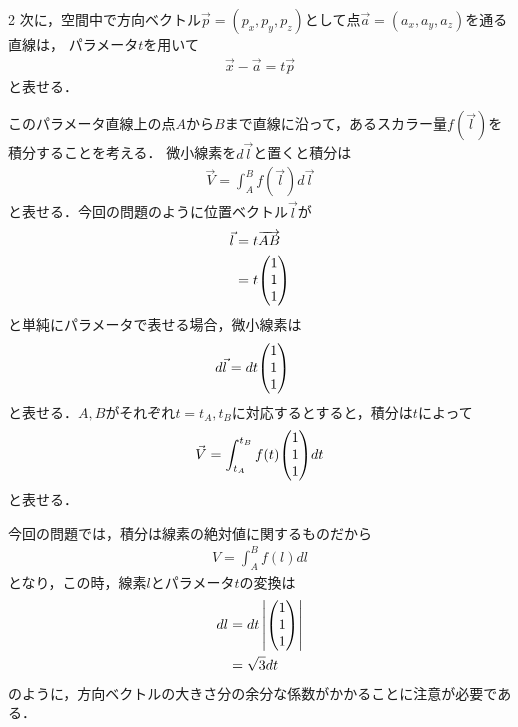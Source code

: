\documentclass[../../main.tex]{subfiles}
\begin{document}
\begin{multicols}{2}
  次に，空間中で方向ベクトル$\vec{p}=(p_x,p_y,p_z)$として点$\vec{a}=(a_x,a_y,a_z)$を通る直線は，
  パラメータ$t$を用いて
  \begin{align}
    \vec{x}-\vec{a} = t\vec{p}
  \end{align}
  と表せる．

  このパラメータ直線上の点$A$から$B$まで直線に沿って，あるスカラー量$f(\vec{l})$を積分することを考える．
  微小線素を$d\vec{l}$と置くと積分は
  \begin{align}
    \vec{V} = \int_{A}^{B} f(\vec{l}) d\vec{l}
  \end{align}
  と表せる．今回の問題のように位置ベクトル$\vec{l}$が
  \begin{align}
    \vec{l}
    & = t \overrightarrow{AB} \\
    & = t \mqty(1  \\ 1 \\ 1)
  \end{align}
  と単純にパラメータで表せる場合，微小線素は
  \begin{align}
    d\vec{l}
    & = dt \mqty(1 \\ 1 \\ 1)
  \end{align}
  と表せる．$A,B$がそれぞれ$t=t_A,t_B$に対応するとすると，積分は$t$によって
  \begin{align}
    \vec{V} = \int_{t_A}^{t_B} f(t) \mqty(1 \\1\\1) dt
  \end{align}
  と表せる．

  今回の問題では，積分は線素の絶対値に関するものだから
  \begin{align}
    V = \int_{A}^{B} f(l) dl
  \end{align}
  となり，この時，線素$l$とパラメータ$t$の変換は
  \begin{align}
    dl
    & =dt \left|\mqty(1 \\ 1 \\ 1)\right| \\
    & = \sqrt{3} dt
  \end{align}
  のように，方向ベクトルの大きさ分の余分な係数がかかることに注意が必要である．


  \newpage
\end{multicols}
\end{document}
